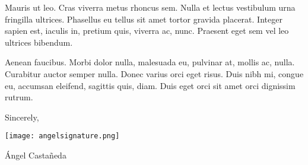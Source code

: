 \documentclass[12pt]{article}
\newcommand{\itemspace}{\vspace{0.5em}}
\begin{document}
\itemspace

Mauris ut leo. Cras viverra metus rhoncus sem. Nulla et lectus vestibulum urna fringilla ultrices. Phasellus eu tellus sit amet tortor gravida placerat. Integer sapien est, iaculis in, pretium quis, viverra ac, nunc. Praesent eget sem vel leo ultrices bibendum. 

\itemspace

Aenean faucibus. Morbi dolor nulla, malesuada eu, pulvinar at, mollis ac, nulla. Curabitur auctor semper nulla. Donec varius orci eget risus. Duis nibh mi, congue eu, accumsan eleifend, sagittis quis, diam. Duis eget orci sit amet orci dignissim rutrum.

\vspace{15mm}

\noindent Sincerely,


\noindent
\texttt{[image: angelsignature.png]}

\noindent Ángel Castañeda
\end{document}
